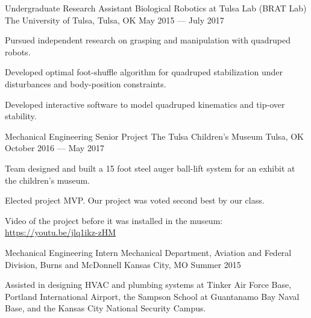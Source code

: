 \begin{cventries}
  \cventry
    {Undergraduate Research Assistant} %
    {Biological Robotics at Tulsa Lab (BRAT Lab)} %
    {The University of Tulsa, Tulsa, OK} %
    {May 2015 --- July 2017} %
    {
      \begin{cvitems} %
        \item {Pursued independent research on grasping and manipulation with quadruped robots.}
        \item {Developed optimal foot-shuffle algorithm for quadruped stabilization under disturbances and body-position constraints.}
        \item {Developed interactive software to model quadruped kinematics and tip-over stability.}
      \end{cvitems}
    }

\cventry
{Mechanical Engineering Senior Project} %
{The Tulsa Children's Museum} %
{Tulsa, OK} %
{October 2016 --- May 2017} %
{
	\begin{cvitems} %
		\item{Team designed and built a 15 foot steel auger ball-lift system for an exhibit at the children's museum.}
		\item{Elected project MVP. Our project was voted second best by our class.}
		\item{Video of the project before it was installed in the museum: \href{https://youtu.be/jlq1ikz-zHM}{\color{awesome} https://youtu.be/jlq1ikz-zHM}}
	\end{cvitems}
}


\cventry
{Mechanical Engineering Intern} %
{Mechanical Department, Aviation and Federal Division, Burns and McDonnell} %
{Kansas City, MO} %
{Summer 2015} %
{
	\begin{cvitems} %
		\item{Assisted in designing HVAC and plumbing systems at Tinker Air Force Base, Portland International Airport, the Sampson School at Guantanamo Bay Naval Base, and the Kansas City National Security Campus.}
	\end{cvitems}
}


\end{cventries}
